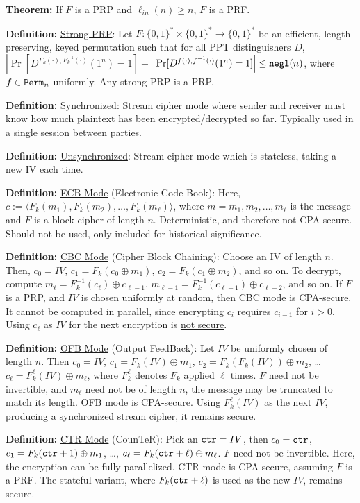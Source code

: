 \documentclass[10pt]{article}
\newcommand{\defn}[1]{{\bf Definition:} \underline{#1}}
\newcommand{\thm}[1]{{\bf Theorem:} \underline{#1}}
\newcommand{\ang}[1]{\langle#1\rangle}
\newcommand{\xor}{\oplus}
\newcommand{\negl}{{\tt negl}}
\newcommand{\ctr}{{\tt ctr}}
\begin{document}
\begin{multicols}{5}
\thm{} If $F$ is a PRP and $\ell_{in}(n)\geq n$, $F$ is a PRF.

\defn{Strong PRP}: Let $F:\{0,1\}^*\times\{0,1\}^*\to\{0,1\}^*$ be an efficient, length-preserving, keyed permutation such that for all PPT distinguishers $D$, $\left|\Pr[D^{F_k(\cdot),F_k^{-1}(\cdot)}(1^n)=1]-\right.$ $\left.\Pr[D^{f(\cdot),f^{-1}(\cdot)}(1^n)=1]\right|\leq\negl(n)$, where $f\in{\tt Perm}_n$ uniformly. Any strong PRP is a PRP.

\defn{Synchronized}: Stream cipher mode where sender and receiver must know how much plaintext has been encrypted/decrypted so far. Typically used in a single session between parties.

\defn{Unsynchronized}: Stream cipher mode which is stateless, taking a new IV each time.

\defn{ECB Mode} (Electronic Code Book): Here, $c:=\ang{F_k(m_1),F_k(m_2),\dots,F_k(m_\ell)}$, where $m=m_1,m_2,\dots,m_\ell$ is the message and $F$ is a block cipher of length $n$. Deterministic, and therefore not CPA-secure. Should not be used, only included for historical significance.

\defn{CBC Mode} (Cipher Block Chaining): Choose an IV of length $n$. Then, $c_0=IV$, $c_1=F_k(c_0\xor m_1)$, $c_2=F_k(c_1\xor m_2)$, and so on. To decrypt, compute $m_\ell=F^{-1}_k(c_\ell)\xor c_{\ell-1}$, $m_{\ell-1}=F_k^{-1}(c_{\ell-1})\xor c_{\ell-2}$, and so on. If $F$ is a PRP, and $IV$ is chosen uniformly at random, then CBC mode is CPA-secure. It cannot be computed in parallel, since encrypting $c_i$ requires $c_{i-1}$ for $i>0$. Using $c_\ell$ as $IV$ for the next encryption is \underline{not secure}.

\defn{OFB Mode} (Output FeedBack): Let $IV$ be uniformly chosen of length $n$. Then $c_0=IV$, $c_1=F_k(IV)\xor m_1$, $c_2=F_k(F_k(IV))\xor m_2$, \dots $c_\ell=F_k^\ell(IV)\xor m_\ell$, where $F_k^\ell$ denotes $F_k$ applied $\ell$ times. $F$ need not be invertible, and $m_\ell$ need not be of length $n$, the message may be truncated to match its length. OFB mode is CPA-secure. Using $F_k^{\ell}(IV)$ as the next $IV$, producing a synchronized stream cipher, it remains secure.

\defn{CTR Mode} (CounTeR): Pick an $\ctr=IV$, then $c_0=\ctr$, $c_1=F_k(\ctr+1)\xor m_1$, \dots, $c_\ell=F_k(\ctr+\ell)\xor m_\ell$. $F$ need not be invertible. Here, the encryption can be fully parallelized. CTR mode is CPA-secure, assuming $F$ is a PRF. The stateful variant, where $F_k(\ctr+\ell)$ is used as the new $IV$, remains secure.


\end{multicols}
\end{document}
